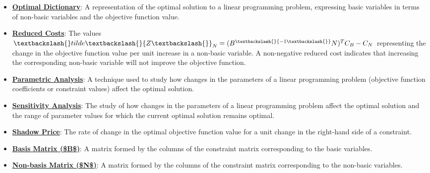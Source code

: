 \documentclass{article}%
\begin{document}
\begin{itemize}[leftmargin=*]%
\item \href{https://www.math.purdue.edu/~yipn/421/2024-09-26-Sensitivity.pdf#page=2}{\textbf{Optimal Dictionary}}: A representation of the optimal solution to a linear programming problem, expressing basic variables in terms of non-basic variables and the objective function value.%
\item \href{https://www.math.purdue.edu/~yipn/421/2024-09-26-Sensitivity.pdf#page=7}{\textbf{Reduced Costs}}: The values $\textbackslash{}tilde\textbackslash{}{Z\textbackslash{}}_N = (B^\textbackslash{}{-1\textbackslash{}}N)^T C_B - C_N$ representing the change in the objective function value per unit increase in a non-basic variable. A non-negative reduced cost indicates that increasing the corresponding non-basic variable will not improve the objective function.%
\item \href{https://www.math.purdue.edu/~yipn/421/2024-09-26-Sensitivity.pdf#page=4}{\textbf{Parametric Analysis}}: A technique used to study how changes in the parameters of a linear programming problem (objective function coefficients or constraint values) affect the optimal solution.%
\item \href{https://www.math.purdue.edu/~yipn/421/2024-09-26-Sensitivity.pdf#page=1}{\textbf{Sensitivity Analysis}}: The study of how changes in the parameters of a linear programming problem affect the optimal solution and the range of parameter values for which the current optimal solution remains optimal.%
\end{itemize}%
\begin{itemize}[leftmargin=*]%
\item \href{https://www.math.purdue.edu/~yipn/421/2024-10-01-SensitivityDuality.pdf#page=10}{\textbf{Shadow Price}}: The rate of change in the optimal objective function value for a unit change in the right-hand side of a constraint.%
\item \href{https://www.math.purdue.edu/~yipn/421/2024-10-01-SensitivityDuality.pdf#page=6}{\textbf{Basis Matrix (\$B\$)}}: A matrix formed by the columns of the constraint matrix corresponding to the basic variables.%
\item \href{https://www.math.purdue.edu/~yipn/421/2024-10-01-SensitivityDuality.pdf#page=6}{\textbf{Non{-}basis Matrix (\$N\$)}}: A matrix formed by the columns of the constraint matrix corresponding to the non-basic variables.%
\end{itemize}%
\end{document}

